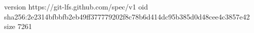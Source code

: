 version https://git-lfs.github.com/spec/v1
oid sha256:2e2314bfbbfb2eb49ff377779202f8c78b6d414dc95b385d0d48cee4c3857e42
size 7261

